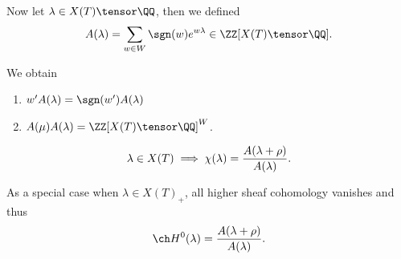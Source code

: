 Now let \(\lambda \in X(T) \tensor \QQ\), then we defined
\begin{align*}  
A(\lambda) = \sum_{w\in W} \sgn(w) e^{w\lambda} \in \ZZ[X(T) \tensor \QQ]
.\end{align*}

We obtain

\begin{enumerate}
\def\labelenumi{\arabic{enumi}.}
\item
  \(w' A(\lambda) = \sgn(w') A(\lambda)\)
\item
  \(A(\mu) A(\lambda) = \ZZ[X(T) \tensor \QQ]^W\).
\end{enumerate}

\begin{theorem}

\begin{align*}  
\lambda\in X(T) \implies \chi(\lambda) = {A(\lambda + \rho) \over A(\lambda)}
.\end{align*}

As a special case when \(\lambda \in X(T)_+\), all higher sheaf
cohomology vanishes and thus
\begin{align*}  
\ch H^0(\lambda) = {A(\lambda + \rho) \over A(\lambda)}
.\end{align*}

\end{theorem}

